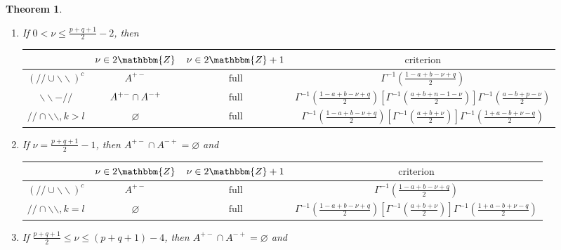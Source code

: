 \documentclass[12pt]{msjproc} %
\newcommand{\tmop}[1]{\ensuremath{\operatorname{#1}}}
\newtheorem{theorem}{Theorem}
\theoremstyle{definition}
\theoremstyle{exampstyle} \newtheorem{examp}[theorem]{Theorem}
\begin{document}
\begin{versiona}
\begin{theorem}
\begin{enumerate}
\begin{enumerate}
      \item If $0 < \nu \leqslant \frac{p + q + 1}{2} - 2$, then
      \begin{center}
        \begin{tabular}{|c|c|c|c|}
          \hline
          & $\nu \in 2\mathbbm{Z}$ & $\nu \in 2\mathbbm{Z}+ 1$ &
          $\tmop{criterion}$\\
          \hline
          $(/ / \cup \backslash\backslash)^c$ & $A^{+ -}$ & $\tmop{full}$ &
          $\Gamma^{- 1} \left( \frac{1 - a + b - \nu + q}{2} \right)$\\
          \hline
          $\backslash\backslash - / /$ & $A^{ + -} \cap A^{- +}$ &
          $\tmop{full}$ & $\Gamma^{- 1} \left( \frac{1 - a + b - \nu + q}{2}
          \right) \left[ \Gamma^{- 1} \left( \frac{a + b + n - 1 - \nu}{2}
          \right) \right] \Gamma^{- 1} \left( \frac{a - b + p - \nu}{2}
          \right)$\\
          \hline
          $/ / \cap \backslash\backslash, k > l$ & $\varnothing$ &
          $\tmop{full}$ & $\Gamma^{- 1} \left( \frac{1 - a + b - \nu + q}{2}
          \right) \left[ \Gamma^{- 1} \left( \frac{a + b + \nu}{2} \right)
          \right] \Gamma^{- 1} \left( \frac{1 + a - b + \nu - q}{2} \right)$\\
          \hline
        \end{tabular}
      \end{center}
      \item If $\nu = \frac{p + q + 1}{2} - 1$, then $A^{+ -} \cap A^{- +} =
      \varnothing$ and
      \begin{center}
        \begin{tabular}{|c|c|c|c|}
          \hline
          & $\nu \in 2\mathbbm{Z}$ & $\nu \in 2\mathbbm{Z}+ 1$ &
          $\tmop{criterion}$\\
          \hline
          $(/ / \cup \backslash\backslash)^c$ & $A^{+ -}$ & $\tmop{full}$ &
          $\Gamma^{- 1} \left( \frac{1 - a + b - \nu + q}{2} \right)$\\
          \hline
          $/ / \cap \backslash\backslash, k = l$ & $\varnothing$ &
          $\tmop{full}$ & $\Gamma^{- 1} \left( \frac{1 - a + b - \nu + q}{2}
          \right) \left[ \Gamma^{- 1} \left( \frac{a + b + \nu}{2} \right)
          \right] \Gamma^{- 1} \left( \frac{1 + a - b + \nu - q}{2} \right)$\\
          \hline
        \end{tabular}
      \end{center}
      \item If $\frac{p + q + 1}{2} \leqslant \nu \leqslant (p + q + 1) - 4$,
      then $A^{+ -} \cap A^{- +} = \varnothing$ and
      

\end{enumerate}
\end{enumerate}
\end{theorem}
\end{versiona}
\end{document}
